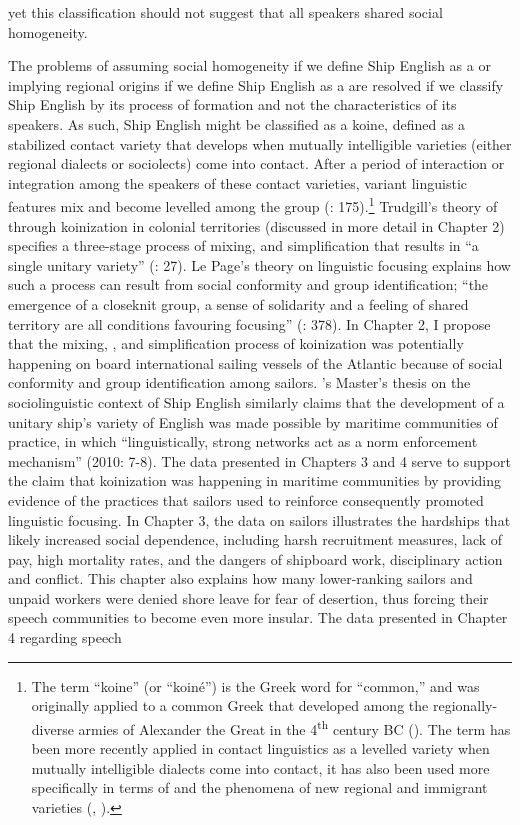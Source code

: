 yet this classification should not suggest that all speakers shared social homogeneity. 

The problems of assuming social homogeneity if we define Ship English as a  or implying regional origins if we define Ship English as a  are resolved if we classify Ship English by its process of formation and not the characteristics of its speakers. As such, Ship English might be classified as a koine, defined as a stabilized contact variety that develops when mutually intelligible varieties (either regional dialects or sociolects) come into contact. After a period of interaction or integration among the speakers of these contact varieties, variant linguistic features mix and become levelled among the group (\citealt{Siegel2001}: 175).\footnote{The term “koine” (or “koiné”) is the Greek word for “common,” and was originally applied to a common Greek  that developed among the regionally-diverse armies of Alexander the Great in the 4\textsuperscript{th} century BC (\citealt{Andriotis1995}). The term has been more recently applied in contact linguistics as a levelled variety when mutually intelligible dialects come into contact, it has also been used more specifically in terms of  \citep{Siegel2001} and the phenomena of new regional and immigrant varieties (\citealt{Trudgill1986}, \citealt{Kerswill2004}).} Trudgill’s theory of  through koinization in colonial territories (discussed in more detail in Chapter 2) specifies a three-stage process of mixing,  and simplification that results in “a single unitary variety” (\citealt{Trudgill1986}: 27). Le Page’s theory on linguistic focusing explains how such a process can result from social conformity and group identification; “the emergence of a closeknit group, a sense of solidarity and a feeling of shared territory are all conditions favouring focusing” (\citealt{Milroy1986}: 378). In Chapter 2, I propose that the mixing, , and simplification process of koinization was potentially happening on board international sailing vessels of the Atlantic because of social conformity and group identification among sailors. \citeauthor{Schultz2010}’s Master’s thesis on the sociolinguistic context of Ship English similarly claims that the development of a unitary ship’s variety of English was made possible by maritime communities of practice, in which “linguistically, strong networks act as a norm enforcement mechanism” (2010: 7-8). The data presented in Chapters 3 and 4 serve to support the claim that koinization was happening in maritime communities by providing evidence of the practices that sailors used to reinforce  consequently promoted linguistic focusing. In Chapter 3, the data on sailors illustrates the hardships that likely increased social dependence, including harsh recruitment measures, lack of pay, high mortality rates, and the dangers of shipboard work, disciplinary action and conflict. This chapter also explains how many lower-ranking sailors and unpaid workers were denied shore leave for fear of desertion, thus forcing their speech communities to become even more insular. The data presented in Chapter 4 regarding speech 